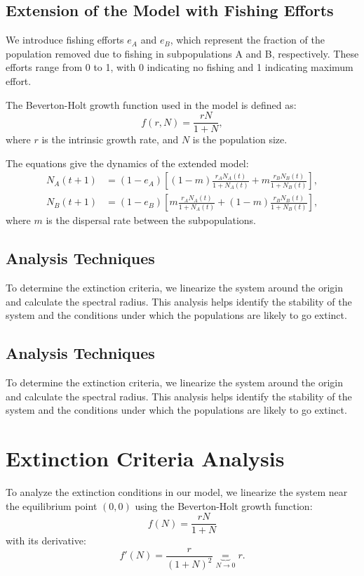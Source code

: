 \documentclass{article}
\begin{document}
\subsection{Extension of the Model with Fishing Efforts}
We introduce fishing efforts $e_A$ and $e_B$, which represent the fraction of the population removed due to fishing in subpopulations A and B, respectively. These efforts range from 0 to 1, with 0 indicating no fishing and 1 indicating maximum effort.

The Beverton-Holt growth function used in the model is defined as:
\begin{equation} 
f(r, N) = \frac{rN}{1 + N},
\end{equation}
where $r$ is the intrinsic growth rate, and $N$ is the population size.

The equations give the dynamics of the extended model:
\begin{align}
N_A(t+1) &= (1 - e_A) \left[(1-m) \frac{r_A N_A(t)}{1 + N_A(t)} + m \frac{r_B N_B(t)}{1 + N_B(t)}\right], \\
N_B(t+1) &= (1 - e_B) \left[m \frac{r_A N_A(t)}{1 + N_A(t)} + (1-m) \frac{r_B N_B(t)}{1 + N_B(t)}\right],
\end{align}
where $m$ is the dispersal rate between the subpopulations.

\subsection{Analysis Techniques}
To determine the extinction criteria, we linearize the system around the origin and calculate the spectral radius. This analysis helps identify the stability of the system and the conditions under which the populations are likely to go extinct.


\subsection{Analysis Techniques}
To determine the extinction criteria, we linearize the system around the origin and calculate the spectral radius. This analysis helps identify the stability of the system and the conditions under which the populations are likely to go extinct.
\section{Extinction Criteria Analysis}

To analyze the extinction conditions in our model, we linearize the system near the equilibrium point $(0, 0)$ using the Beverton-Holt growth function:
\[
f(N) = \frac{rN}{1+N}
\]
with its derivative:
\[
f'(N) = \frac{r}{(1+N)^2} \underbrace{=}_{N\rightarrow 0} r.
\]
\end{document}
